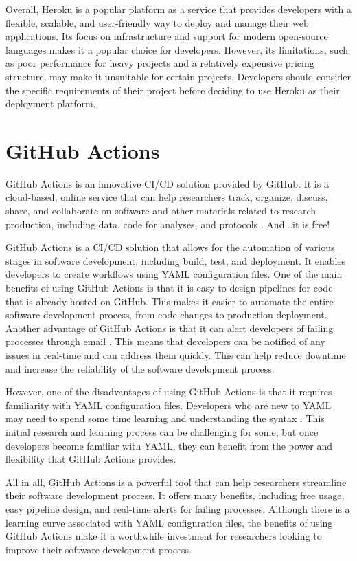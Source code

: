 Overall, Heroku is a popular platform as a service that provides developers with a flexible, scalable, and user-friendly way to deploy and manage their web applications. Its focus on infrastructure and support for modern open-source languages makes it a popular choice for developers. However, its limitations, such as poor performance for heavy projects and a relatively expensive pricing structure, may make it unsuitable for certain projects. Developers should consider the specific requirements of their project before deciding to use Heroku as their deployment platform.

\section{GitHub Actions}
GitHub Actions is an innovative CI/CD solution provided by GitHub. It is a cloud-based, online service that can help researchers track, organize, discuss, share, and collaborate on software and other materials related to research production, including data, code for analyses, and protocols \cite{ds, kimetal}. And...it is free!

GitHub Actions is a CI/CD solution that allows for the automation of various stages in software development, including build, test, and deployment. It enables developers to create workflows using YAML configuration files. One of the main benefits of using GitHub Actions is that it is easy to design pipelines for code that is already hosted on GitHub. This makes it easier to automate the entire software development process, from code changes to production deployment. Another advantage of GitHub Actions is that it can alert developers of failing processes through email \cite{kimetal}. This means that developers can be notified of any issues in real-time and can address them quickly. This can help reduce downtime and increase the reliability of the software development process.

However, one of the disadvantages of using GitHub Actions is that it requires familiarity with YAML configuration files. Developers who are new to YAML may need to spend some time learning and understanding the syntax \cite{ds}. This initial research and learning process can be challenging for some, but once developers become familiar with YAML, they can benefit from the power and flexibility that GitHub Actions provides.

All in all, GitHub Actions is a powerful tool that can help researchers streamline their software development process. It offers many benefits, including free usage, easy pipeline design, and real-time alerts for failing processes. Although there is a learning curve associated with YAML configuration files, the benefits of using GitHub Actions make it a worthwhile investment for researchers looking to improve their software development process.

